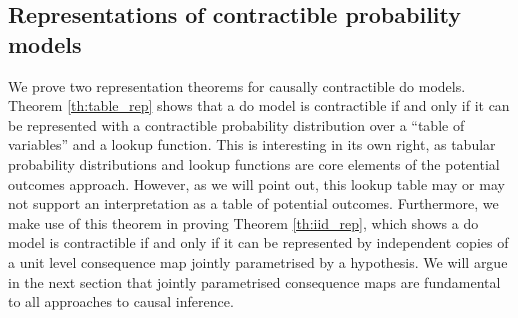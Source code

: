 





\subsection{Representations of contractible probability models}

We prove two representation theorems for causally contractible do models. Theorem \ref{th:table_rep} shows that a do model is contractible if and only if it can be represented with a contractible probability distribution over a ``table of variables'' and a lookup function. This is interesting in its own right, as tabular probability distributions and lookup functions are core elements of the potential outcomes approach. However, as we will point out, this lookup table may or may not support an interpretation as a table of potential outcomes. Furthermore, we make use of this theorem in proving Theorem \ref{th:iid_rep}, which shows a do model is contractible if and only if it can be represented by independent copies of a unit level consequence map jointly parametrised by a hypothesis. We will argue in the next section that jointly parametrised consequence maps are fundamental to all approaches to causal inference.

